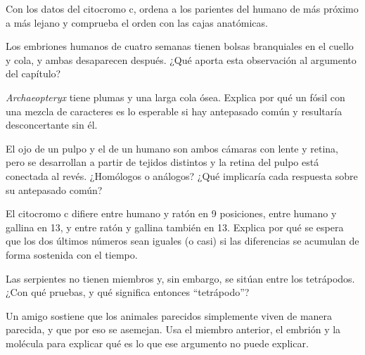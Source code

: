 \begin{exercise}[$\star\star$]\label{exo:g10:common-ancestry:9}
Con los datos del citocromo c, ordena a los parientes del humano de más
próximo a más lejano y comprueba el orden con las cajas anatómicas.
\end{exercise}

\begin{exercise}[$\star\star$]\label{exo:g10:common-ancestry:10}
Los embriones humanos de cuatro semanas tienen bolsas branquiales en el
cuello y cola, y ambas desaparecen después. ¿Qué aporta esta
observación al argumento del capítulo?
\end{exercise}

\begin{exercise}[$\star\star$]\label{exo:g10:common-ancestry:11}
\emph{Archaeopteryx} tiene plumas y una larga cola ósea. Explica por
qué un fósil con una mezcla de caracteres es lo esperable si hay
antepasado común y resultaría desconcertante sin él.
\end{exercise}

\begin{exercise}[$\star\star\star$]\label{exo:g10:common-ancestry:12}
El ojo de un pulpo y el de un humano son ambos cámaras con lente y
retina, pero se desarrollan a partir de tejidos distintos y la retina
del pulpo está conectada al revés. ¿Homólogos o análogos? ¿Qué
implicaría cada respuesta sobre su antepasado común?
\end{exercise}

\begin{exercise}[$\star\star\star$]\label{exo:g10:common-ancestry:13}
El citocromo c difiere entre humano y ratón en 9 posiciones, entre
humano y gallina en 13, y entre ratón y gallina también en 13. Explica
por qué se espera que los dos últimos números sean iguales (o casi) si
las diferencias se acumulan de forma sostenida con el tiempo.
\end{exercise}

\begin{exercise}[$\star\star\star$]\label{exo:g10:common-ancestry:14}
Las serpientes no tienen miembros y, sin embargo, se sitúan entre los
tetrápodos. ¿Con qué pruebas, y qué significa entonces ``tetrápodo''?
\end{exercise}

\begin{exercise}[$\star\star\star$]\label{exo:g10:common-ancestry:15}
Un amigo sostiene que los animales parecidos simplemente viven de
manera parecida, y que por eso se asemejan. Usa el miembro anterior, el
embrión y la molécula para explicar qué es lo que ese argumento no
puede explicar.
\end{exercise}


